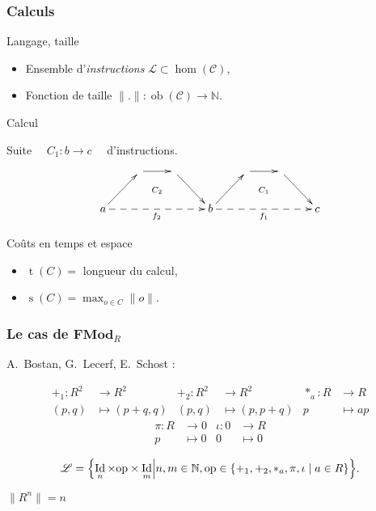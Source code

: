 \documentclass[10pt]{beamer}
\newcommand{\cat}[1]{\mathscr{#1}}
\newcommand{\lcat}[1]{\mathbf{#1}}
\newcommand{\C}{\cat{C}}
\renewcommand{\L}{\cat{L}}
\newcommand{\size}[1]{\lVert#1\rVert}
\DeclareMathOperator{\ob}{ob}
\DeclareMathOperator{\Id}{Id}
\newcommand{\N}{\mathbb{N}}
\newcommand{\ra}{\rightarrow}
\DeclareMathOperator{\Time}{t}
\DeclareMathOperator{\Space}{s}
\begin{document}
\begin{frame}
  \frametitle{Calculs}

  \begin{block}{Langage, taille}
    \begin{itemize}
    \item Ensemble d'\emph{instructions} \hfill $\L \subset \hom(\C)$,
    \item Fonction de taille \hfill $\size{.} : \ob(\C)\ra\N$.
    \end{itemize}
  \end{block}

  \begin{block}{Calcul}
    \begin{center}
      Suite $\quad C_1:b\ra c\quad$ d'instructions.
    \end{center}
  \end{block}

  \[\xymatrix{
    & \ar[r]\ar@{}[dr]|{C_2} & \ar[dr] &
    & \ar[r]\ar@{}[dr]|{C_1} & \ar[dr] \\
    a \ar[ur]\ar@{-->}[rrr]_{f_2} &&& b
    \ar[ur]\ar@{-->}[rrr]_{f_1} &&& c
  }\]

  \begin{block}{Coûts en temps et espace}
    \begin{itemize}
    \item $\Time(C) = $ longueur du calcul,
    \item $\Space(C) = \max_{o\in C}\size{o}$.
    \end{itemize}
  \end{block}

\end{frame}


\begin{frame}
  \frametitle{Le cas de $\lcat{FMod}_R$}
  A.~Bostan, G.~Lecerf, E.~Schost :

  \begin{align*}
    +_1 : R^2 &\ra R^2         &   +_2 : R^2&\ra R^2       &  *_a : R&\ra R\\
    (p,q)&\mapsto(p+q,q)  &      (p,q)&\mapsto(p,p+q) &       p&\mapsto ap
  \end{align*}
  \begin{align*}
    \pi : R&\ra 0     &  \iota : 0&\ra R   \\
          p&\mapsto0  &          0&\mapsto0
  \end{align*}
  
  \begin{block}{}
    \begin{equation*}
      \label{eq:linlang}
      \L = \Bigl\{\Id_n\times\mathrm{op}\times\Id_m \Bigl\lvert
      n,m\in\N, \mathrm{op}\in\{+_1,+_2,*_a,\pi,\iota\;|\;a\in R\} \Bigr\}
      \text{.}
    \end{equation*}
  \end{block}

  \begin{block}{}
    \begin{center}
      $\size{R^n} = n$
    \end{center}
  \end{block}

\end{frame}
\end{document}
